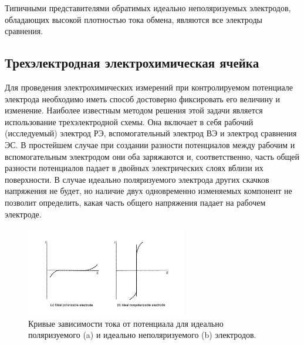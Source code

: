 \documentclass[a4paper,12pt]{article}
\begin{document}
Типичными представителями обратимых идеально неполяризуемых электродов, обладающих высокой плотностью тока обмена, являются все электроды сравнения.

\subsection{Трехэлектродная электрохимическая ячейка}

Для проведения электрохимических измерений при контролируемом потенциале
электрода необходимо иметь способ достоверно фиксировать его величину и изменение. Наиболее известным методом решения этой задачи является использование
трехэлектродной схемы. Она включает в себя рабочий (исследуемый) электрод РЭ,
вспомогательный электрод ВЭ и электрод сравнения ЭС. В простейшем случае
при создании разности потенциалов между рабочим и вспомогательным электродом они оба заряжаются и, соответственно, часть общей разности потенциалов
падает в двойных электрических слоях вблизи их поверхности. В случае идеально
поляризуемого электрода других скачков напряжения не будет, но наличие двух
одновременно изменяемых компонент не позволит определить, какая часть общего
напряжения падает на рабочем электроде.
\begin{figure}[h!]
    \centering
    \includegraphics[width=7cm]{3.png}
    \caption{Кривые зависимости тока от потенциала для идеально поляризуемого (a) и идеально неполяризуемого (b) электродов.}
    \label{fig:vac}
\end{figure}
\end{document}
